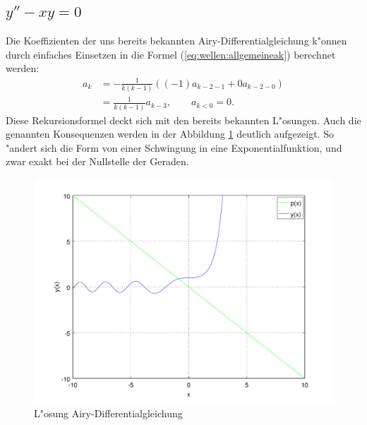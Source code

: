 \subsection{\texorpdfstring{$y''-xy = 0$}{y''-xy = 0}}
Die Koeffizienten der uns bereits bekannten Airy-Differentialgleichung k"onnen 
durch einfaches Einsetzen in die Formel (\ref{eq:wellen:allgemeineak}) 
berechnet werden:
\begin{equation*}
	\begin{split}
		a_k &= -\frac{1}{k(k-1)} ((-1) a_{k-2-1} + 
		0 a_{k-2-0})
		\\
		&= \frac{1}{k(k-1)} a_{k-3}, \qquad a_{k < 0} = 0.
	\end{split}
\end{equation*}
Diese Rekursionsformel deckt sich mit den bereits bekannten L"osungen.
Auch die genannten Konsequenzen werden in der Abbildung 
\ref{fig:wellen:airy-dgl} deutlich aufgezeigt. So "andert sich die Form von 
einer Schwingung in eine Exponentialfunktion, und zwar exakt bei der Nullstelle 
der Geraden.

\begin{figure}
	\includegraphics[width=1\hsize]{./wellen/images/allgemein/n1.pdf}
	\caption{L"osung Airy-Differentialgleichung}
	\label{fig:wellen:airy-dgl}
\end{figure}